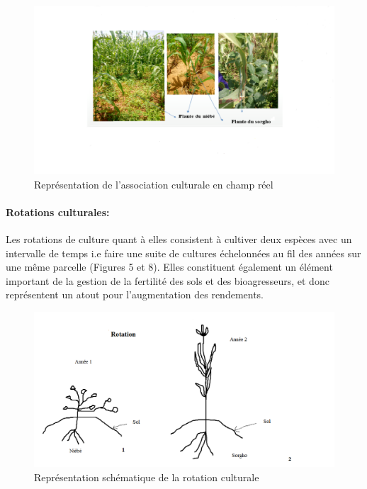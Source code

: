 \documentclass[a4paper,11pt]{article}
\begin{document}
\begin{figure}%
  \begin{center}
   \includegraphics[width=18cm]{images/AssociationChampReel}
\end{center}
\caption{ Représentation de l'association culturale en champ réel}
\end{figure}

\paragraph{Rotations culturales:}

Les rotations de culture quant à elles consistent à cultiver deux
espèces avec un intervalle de temps i.e faire une suite de cultures
échelonnées au fil des années sur une même parcelle (Figures 5 et
8). Elles constituent également un élément important de la gestion de
la fertilité des sols et des bioagresseurs, et donc représentent un
atout pour l’augmentation des rendements.

\begin{figure}%
  \begin{center}
   \includegraphics[width=18cm]{images/Rotation}
\end{center}
\caption{ Représentation schématique de la rotation culturale}
\end{figure}
\end{document}
